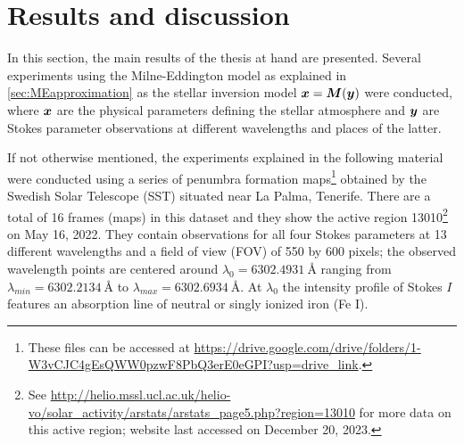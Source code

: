 \documentclass[a4paper,12pt]{report}
\begin{document}
\FloatBarrier

\chapter{Results and discussion}\label{chap:results_and_discussion}
In this section, the main results of the thesis at hand are presented. Several experiments using the Milne-Eddington model as explained in \cref{sec:MEapproximation} as the stellar inversion model $\bm{x} = \bm{M}(\bm{y})$ were conducted, where $\bm{x}$ are the physical parameters defining the stellar atmosphere and $\bm{y}$ are Stokes parameter observations at different wavelengths and places of the latter.

If not otherwise mentioned, the experiments explained in the following material were conducted using a series of penumbra formation maps\footnote{These files can be accessed at \url{https://drive.google.com/drive/folders/1-W3vCJC4gEsQWW0pzwF8PbQ3erE0eGPI?usp=drive_link}.} obtained by the Swedish Solar Telescope (SST) situated near La Palma, Tenerife. There are a total of 16 frames (maps) in this dataset and they show the active region 13010\footnote{See \url{http://helio.mssl.ucl.ac.uk/helio-vo/solar_activity/arstats/arstats_page5.php?region=13010} for more data on this active region; website last accessed on December 20, 2023.} on May 16, 2022. They contain observations for all four Stokes parameters at 13 different wavelengths and a field of view (FOV) of 550 by 600 pixels; the observed wavelength points are centered around $\lambda_0 = \SI{6302.4931}{\angstrom}$ ranging from $\lambda_{min} = \SI{6302.2134}{\angstrom}$ to $\lambda_{max} = \SI{6302.6934}{\angstrom}$. At $\lambda_0$ the intensity profile of Stokes $I$ features an absorption line of neutral or singly ionized iron (Fe I).
\end{document}
